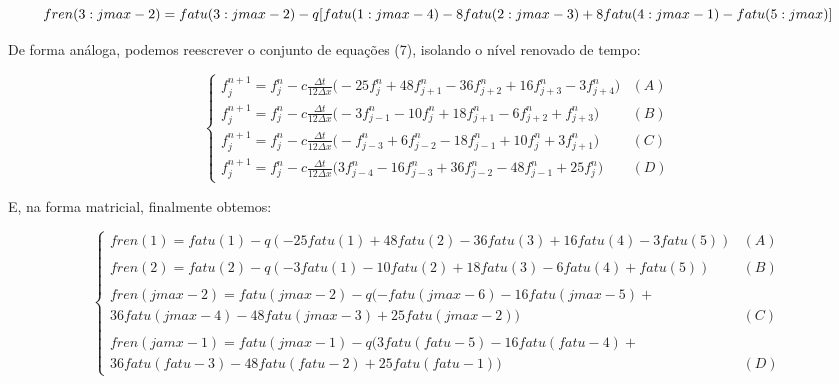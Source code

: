 \documentclass[11pt]{article}
\begin{document}
\begin{equation}
    fren(3:jmax-2) = fatu(3:jmax-2)- \\ q[fatu(1:jmax-4)-8fatu(2:jmax-3)+8fatu(4:jmax-1)-fatu(5:jmax)]
\end{equation}

De forma análoga, podemos reescrever o conjunto de equações (7),
isolando o nível renovado de tempo:

\begin{equation}
    \begin{cases}
            f^{n+1}_{j} = f^{n}_{j}-c\frac{\Delta{t}}{12\Delta{x}}\biggl( - 25f^{n}_{j} + 48f^{n}_{j+1} - 36f^{n}_{j+2} + 16f^{n}_{j+3} - 3f^{n}_{j+4} \bigg) & (A) \\
            f^{n+1}_{j} = f^{n}_{j}-c\frac{\Delta{t}}{12\Delta{x}}\biggl( - 3f^{n}_{j-1} - 10f^{n}_{j} + 18f^{n}_{j+1} - 6f^{n}_{j+2} + f^{n}_{j+3}  \bigg) & (B) \\
            f^{n+1}_{j} = f^{n}_{j}-c\frac{\Delta{t}}{12\Delta{x}}\biggl( - f^{n}_{j-3} + 6f^{n}_{j-2} - 18f^{n}_{j-1} + 10f^{n}_{j} + 3f^{n}_{j+1} \bigg) & (C) \\
            f^{n+1}_{j} = f^{n}_{j}-c\frac{\Delta{t}}{12\Delta{x}}\biggl( 3f^{n}_{j-4} - 16f^{n}_{j-3} + 36f^{n}_{j-2} - 48f^{n}_{j-1} + 25f^{n}_{j} \bigg) & (D)
    \end{cases}
\end{equation}

E, na forma matricial, finalmente obtemos:

\begin{equation}
\begin{cases}
    fren(1) = fatu(1) - q(-25 fatu(1) + 48fatu(2) - 36fatu(3) + 16fatu(4) - 3fatu(5)) & (A) \\
    \\
    fren(2) = fatu(2) - q(-3fatu(1) - 10fatu(2) + 18fatu(3) - 6fatu(4) + fatu(5))& (B) \\
    \\
    fren(jmax-2) = fatu(jmax-2) - q(-fatu(jmax-6) - 16fatu(jmax-5) + \\ 36fatu(jmax-4) - 48fatu(jmax-3) + 25fatu(jmax-2))& (C) \\
    \\
    fren(jamx-1) = fatu(jmax-1) - q(3fatu(fatu-5) - 16fatu(fatu-4) + \\ 36fatu(fatu-3) - 48fatu(fatu-2) + 25fatu(fatu-1))& (D)
\end{cases}
\end{equation}
\end{document}
